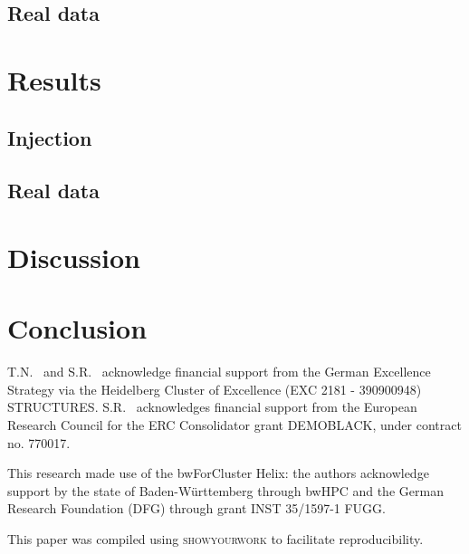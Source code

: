 \documentclass[aps,prd,twocolumn,superscriptaddress,preprintnumbers,nofootinbib,hidelinks]{revtex4-2}
\begin{document}
\subsection{Real data}
\label{sec:real-data-setup}

\section{Results}
\label{sec:results}

\subsection{Injection}
\label{sec:injection-results}



\subsection{Real data}
\label{sec:real-data-results}



\section{Discussion}
\label{sec:discussion}



\section{Conclusion}
\label{sec:conclusion}

\begin{acknowledgments}
T.N.~ and S.R.~ acknowledge financial support from the German Excellence Strategy via the Heidelberg Cluster of Excellence (EXC 2181 - 390900948) STRUCTURES.
S.R.~ acknowledges financial support from the European Research Council for the ERC Consolidator grant DEMOBLACK, under contract no. 770017. 

This research made use of the bwForCluster Helix: the authors acknowledge support by the state of Baden-Württemberg through bwHPC and the German Research Foundation (DFG) through grant INST 35/1597-1 FUGG.

This paper was compiled using \textsc{showyourwork} \cite{Luger2021} to facilitate reproducibility.

\end{acknowledgments}


\end{document}
